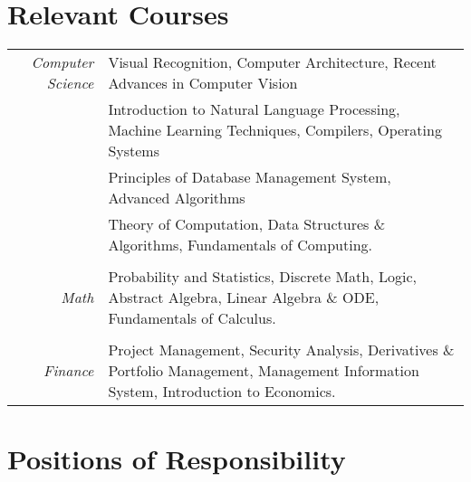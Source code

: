 \documentclass[a4paper]{norm-resume}
\begin{document}
\section{Relevant Courses}

\vspace{2mm} %
\begin{tabular}{r|p{16cm}}	
	
	\normalsize\emph{Computer Science} & \small{Visual Recognition, Computer Architecture, Recent Advances in Computer Vision}\\
	& \small{Introduction to Natural Language Processing, Machine Learning Techniques, Compilers, Operating Systems}\\
	& \small{Principles of Database Management System, Advanced Algorithms}\\
	& \small{Theory of Computation, Data Structures \& Algorithms, Fundamentals of Computing.}\\
	
	\multicolumn{2}{c}{} \\
	\normalsize\emph{Math} & \small{Probability and Statistics, Discrete Math, Logic, Abstract Algebra, Linear Algebra \& ODE, Fundamentals of Calculus.}\\
	
	\multicolumn{2}{c}{} \\
	\normalsize\emph{Finance} & \small{Project Management, Security Analysis, Derivatives \& Portfolio Management, Management Information System, Introduction to Economics.} \\
	\end{tabular}

\vspace{2mm}


\section{Positions of Responsibility}

\vspace{2mm} %
		
\end{document}

